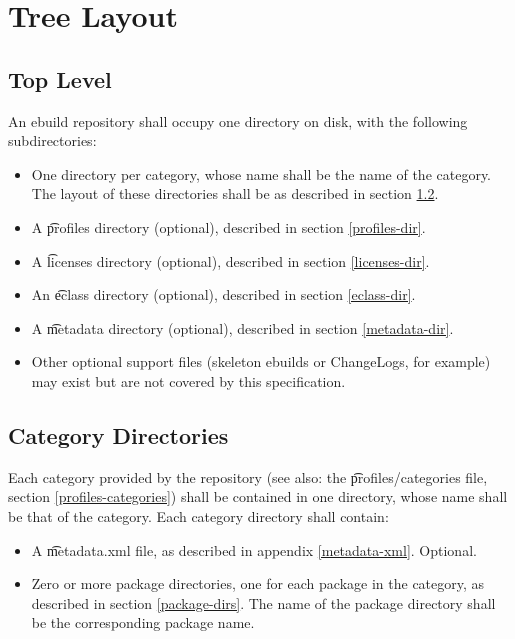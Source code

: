 \chapter{Tree Layout}

\section{Top Level}

An ebuild repository shall occupy one directory on disk, with the following subdirectories:
\begin{itemize}
\item One directory per category, whose name shall be the name of the category. The layout of
    these directories shall be as described in section \ref{category-dirs}.
\item A \t{profiles} directory (optional), described in section \ref{profiles-dir}.
\item A \t{licenses} directory (optional), described in section \ref{licenses-dir}.
\item An \t{eclass} directory (optional), described in section \ref{eclass-dir}.
\item A \t{metadata} directory (optional), described in section \ref{metadata-dir}.
\item Other optional support files (skeleton ebuilds or ChangeLogs, for example) may exist
    but are not covered by this specification.

\end{itemize}

\section{Category Directories}
\label{category-dirs}

Each category provided by the repository (see also: the \t{profiles/categories} file, section
\ref{profiles-categories}) shall be contained in one directory, whose name shall be that of the
category. Each category directory shall contain:
\begin{itemize}
\item A \t{metadata.xml} file, as described in appendix \ref{metadata-xml}. Optional.
\item Zero or more package directories, one for each package in the category, as described in section
    \ref{package-dirs}. The name of the package directory shall be the corresponding package name.
\end{itemize}

